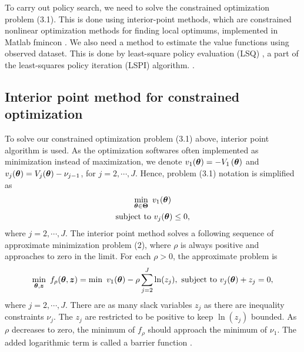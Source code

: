 To carry out policy search, we need to solve the constrained optimization problem (3.1). This is done using interior-point methods, which are constrained nonlinear optimization methods for finding local optimums, implemented in Matlab fmincon \cite{Waltz2006,Byrd1999}.  We also need a method to estimate the value functions using observed dataset. This is done by least-square policy evaluation (LSQ) , a part of the least-squares policy iteration (LSPI) algorithm. \cite{Lagoudakis2003,Lagoudakis2001}. 

\subsection{Interior point method for constrained optimization}
To solve our constrained optimization problem (3.1) above, interior point algorithm is used. As the optimization softwares often implemented as minimization instead of maximization, we denote $v_1(\boldsymbol{\theta}) = - V_1\left({\boldsymbol{\theta}}\right)$ and  $v_j(\boldsymbol{\theta}) = V_j(\boldsymbol{\theta}) - \nu_{j-1}$, for $j = 2, \cdots, J$. Hence,  problem (3.1) notation is simplified as
\begin{equation}
\begin{gathered}
\min_{\boldsymbol{\theta} \in \boldsymbol{\Theta}}  \,\, v_1(\boldsymbol{\theta}) \\ 
\text{subject to}  \,\, v_j(\boldsymbol{\theta}) \le 0,
\end{gathered}
\end{equation}
where  $j = 2, \cdots, J$.
The interior point method solves a following sequence of approximate minimization problem (2), where $\rho$ is always positive and approaches to zero in the limit. For each $\rho >0$, the approximate problem is 
\begin{equation}
\begin{gathered}
\min_{\boldsymbol{\theta}, \boldsymbol{z}} \,\, f_{\rho}(\boldsymbol{\theta}, \boldsymbol{z}) = \min \,\,v_1(\boldsymbol{\theta}) - \rho \sum_{j=2}^J \ln(z_j), \text{ subject to } v_j(\boldsymbol{\theta})  + z_j = 0,
\end{gathered}
\end{equation}
where $j = 2, \cdots, J$. There are as many slack variables $z_j$ as there are inequality constraints $\nu_j$. The $z_j$ are restricted to be positive to keep $\ln(z_j)$ bounded. As $\rho$ decreases to zero, the minimum of $f_\rho$ should approach the minimum of $\nu_1$. The added logarithmic term is called a barrier function \cite{Waltz2006,Byrd1999}.
